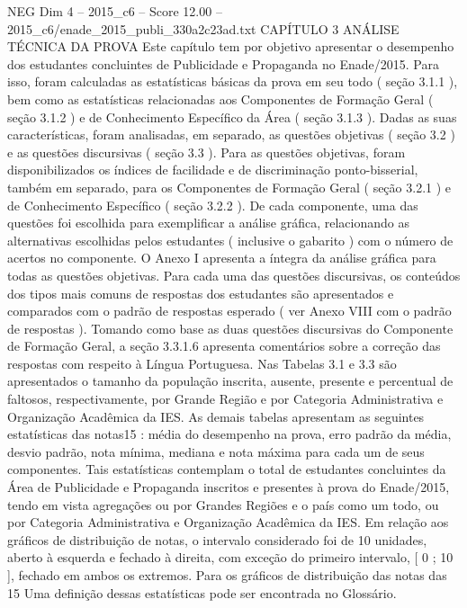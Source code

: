 \begin{textsample}{NEG Dim 4 – 2015\_c6 – Score 12.00 – 2015\_c6/enade\_2015\_publi\_330a2c23ad.txt}  \label{ex:f4_neg_338}
CAPÍTULO 3 ANÁLISE TÉCNICA DA PROVA Este capítulo tem por objetivo apresentar o desempenho dos estudantes concluintes de Publicidade e Propaganda no Enade/2015.
Para isso, foram calculadas as estatísticas básicas da prova em seu todo ( seção 3.1.1 ), bem como as estatísticas relacionadas aos Componentes de Formação Geral ( seção 3.1.2 ) e de Conhecimento Específico da Área ( seção 3.1.3 ).
Dadas as suas características, foram analisadas, em separado, as questões objetivas ( seção 3.2 ) e as questões discursivas ( seção 3.3 ).
Para as questões objetivas, foram disponibilizados os índices de facilidade e de discriminação ponto-bisserial, também em separado, para os Componentes de Formação Geral ( seção 3.2.1 ) e de Conhecimento Específico ( seção 3.2.2 ).
De cada componente, uma das questões foi escolhida para exemplificar a análise gráfica, relacionando as alternativas escolhidas pelos estudantes ( inclusive o gabarito ) com o número de acertos no componente.
O Anexo I apresenta a íntegra da análise gráfica para todas as questões objetivas.
Para cada uma das questões discursivas, os conteúdos dos tipos mais comuns de respostas dos estudantes são apresentados e comparados com o padrão de respostas esperado ( ver Anexo VIII com o padrão de respostas ).
Tomando como base as duas questões discursivas do Componente de Formação Geral, a seção 3.3.1.6 apresenta comentários sobre a correção das respostas com respeito à Língua Portuguesa.
Nas Tabelas 3.1 e 3.3 são apresentados o tamanho da população inscrita, ausente, presente e percentual de faltosos, respectivamente, por Grande Região e por Categoria Administrativa e Organização Acadêmica da IES.
As demais tabelas apresentam as seguintes estatísticas das notas15 : média do desempenho na prova, erro padrão da média, desvio padrão, nota mínima, mediana e nota máxima para cada um de seus componentes.
Tais estatísticas contemplam o total de estudantes concluintes da Área de Publicidade e Propaganda inscritos e presentes à prova do Enade/2015, tendo em vista agregações ou por Grandes Regiões e o país como um todo, ou por Categoria Administrativa e Organização Acadêmica da IES.
Em relação aos gráficos de distribuição de notas, o intervalo considerado foi de 10 unidades, aberto à esquerda e fechado à direita, com exceção do primeiro intervalo, [ 0 ; 10 ], fechado em ambos os extremos.
Para os gráficos de distribuição das notas das 15 Uma definição dessas estatísticas pode ser encontrada no Glossário.

\end{textsample}
